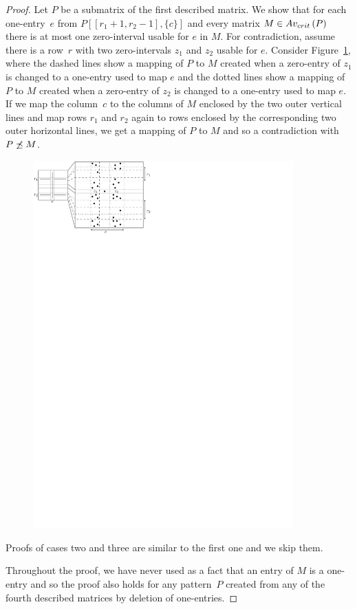 \begin{proof}
Let $P$ be a submatrix of the first described matrix. We show that for each one-entry~$e$ from $P[[r_1+1,r_2-1],\{c\}]$ and every matrix $M\in Av_{crit}\left(P\right)$ there is at most one zero-interval usable for $e$ in $M$. For contradiction, assume there is a row~$r$ with two zero-intervals $z_1$ and $z_2$ usable for $e$. Consider Figure~\ref{fig:lemmaI1}, where the dashed lines show a mapping of $P$ to $M$ created when a zero-entry of $z_1$ is changed to a one-entry used to map $e$ and the dotted lines show a mapping of $P$ to $M$ created when a zero-entry of $z_2$ is changed to a one-entry used to map $e$. If we map the column~$c$ to the columns of $M$ enclosed by the two outer vertical lines and map rows $r_1$ and $r_2$ again to rows enclosed by the corresponding two outer horizontal lines, we get a mapping of $P$ to $M$ and so a contradiction with $P\not\preceq M$.

\begin{figure}[!ht]
\centering
\includegraphics[width=100mm]{img/lemmaI1.pdf}
\caption{}
\label{fig:lemmaI1}
\end{figure}
Proofs of cases two and three are similar to the first one and we skip them.

Throughout the proof, we have never used as a fact that an entry of $M$ is a one-entry and so the proof also holds for any pattern~$P$ created from any of the fourth described matrices by deletion of one-entries.
\end{proof}

